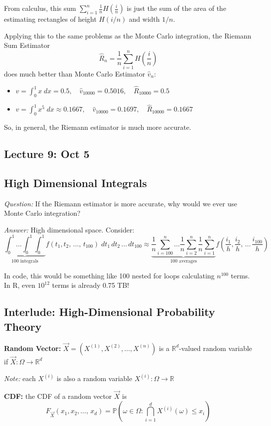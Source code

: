 \documentclass[12pt]{article}
\renewcommand{\hat}[1]{\widehat{#1}}
\renewcommand{\P}{\mathbb{P}}
\newcommand{\R}{\mathbb{R}}
\begin{document}
From calculus, this sum $\sum_{i=1}^n \frac{1}{n}H(\frac{i}{n})$ is just the sum of the area of the estimating rectangles of height $H(i/n)$ and width $1/n$.

Applying this to the same problems as the Monte Carlo integration, the Riemann Sum Estimator
\[\boxed{\hat R_n = \frac{1}{n}\sum_{i=1}^n H(\frac{i}{n})}\]
does much better than Monte Carlo Estimator $\hat v_n$:
\begin{itemize}
    \item $v = \int_0^1 x \; dx = 0.5, \quad \hat{v}_{10000} = 0.5016, \quad \hat{R}_{10000} = 0.5$
    \item $v = \int_0^1 x^5 \; dx \approx 0.1667, \quad \hat{v}_{10000} = 0.1697, \quad \hat{R}_{10000} = 0.1667$
\end{itemize}
So, in general, the Riemann estimator is much more accurate. 

\subsection{Lecture 9: Oct 5}
\subsection{High Dimensional Integrals}
\emph{Question:} If the Riemann estimator is more accurate, why would we ever use Monte Carlo integration? 

\emph{Answer:} High dimensional space. Consider:
\[\underbrace{\int_0^1 \dots \int_0^1 \int_0^1}_{\text{100 integrals}} f(t_1, t_2, \, \dots,\, t_{100}) \; dt_1\, dt_2\, \dots\, dt_{100} \approx \underbrace{\frac{1}{n}\sum_{i=100}^n \dots \frac{1}{n}\sum_{i=2}^n \frac{1}{n}\sum_{i=1}^n}_{\text{100 averages}} f(\frac{i_1}{h}, \frac{i_2}{h}, \, \dots\, \frac{i_{100}}{h})\]

In code, this would be something like 100 nested for loops calculating $n^{100}$ terms. In R, even $10^{12}$ terms is already 0.75 TB! 

\subsection{Interlude: High-Dimensional Probability Theory}
\textbf{Random Vector:} $\vec{X} = (X^{(1)}, X^{(2)}, \dots, X^{(n)})$ is a $\R^d$-valued random variable if $\vec{X}: \Omega \to \R^d$

\emph{Note:} each $X^{(i)}$ is also a random variable $X^{(i)}: \Omega \to \R$

\textbf{CDF:} the CDF of a random vector $\vec X$ is 
\[F_{\vec X}(x_1, x_2, \dots,\, x_d) = \P(\omega \in \Omega: \bigcap_{i=1}^d X^{(i)}(\omega) \leq x_i)\] 
\end{document}
